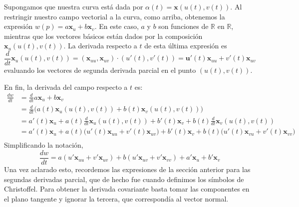 \documentclass[spanish]{book}
\theoremstyle{definition}
\begin{document}
Supongamos que nuestra curva está dada por $\alpha(t)=\mathbf x(u(t),v(t))$. Al restringir nuestro campo vectorial a la curva, como arriba, obtenemos la expresión $w(p)=a\mathbf x_u+b\mathbf x_v$. En este caso, $a$ y $b$ son funciones de $\mathbb R $ en $\mathbb R$, mientras que los vectores básicos están dados por la composición $\mathbf x_u(u(t),v(t))$. La derivada respecto a $t$ de esta última expresión es
\[\frac{d}{dt}\mathbf x_u(u(t),v(t))=(\mathbf x_{uu},\mathbf x_{uv})·(u'(t),v'(t))=\mathbf u'(t)\mathbf x_{uu}+v'(t)\mathbf x_{uv}\]
evaluando los vectores de segunda derivada parcial en el punto $(u(t),v(t))$.

En fin, la derivada del campo respecto a $t$ es:
\begin{align*}
	\frac{dw}{dt}&=\frac{d}{dt}a\mathbf x_u+b\mathbf x_v\\
	&=\frac{d}{dt}\Big(a(t)\mathbf x_u(u(t),v(t))+b(t)\mathbf x_v(u(t),v(t))\Big)\\
	&=a'(t)\mathbf x_u+a(t)\frac{d}{dt}\mathbf x_u(u(t),v(t))+b'(t)\mathbf x_v+b(t)\frac{d}{dt}\mathbf x_v(u(t),v(t))\\
	&=a'(t)\mathbf x_u+a(t)\big(u'(t)\mathbf x_{uu}+v'(t)\mathbf x_{uv}\big)
	+b'(t)\mathbf x_v+b(t)\big(u'(t)\mathbf x_{vu}+v'(t)\mathbf x_{vv}\big)\\
\end{align*}
Simplificando la notación,
\[\frac{dw}{dt}=a(u'\mathbf x_{uu}+v'\mathbf x_{uv})+b(u'\mathbf x_{uv}+v'\mathbf x_{vv})+a'\mathbf x_u+b'\mathbf x_v\]
Una vez aclarado esto, recordemos las expresiones de la sección anterior para las segundas derivadas parcial, que de hecho fue cuando definimos los símbolos de Christoffel. Para obtener la derivada covariante basta tomar las componentes en el plano tangente y ignorar la tercera, que correspondía al vector normal.
\end{document}
